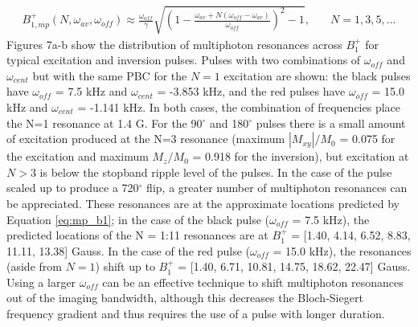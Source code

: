 \documentclass{article}
\begin{document}
\begin{equation}
\begin{array}{ll}
    B_{1,mp}^+(N,\omega_{av},\omega_{off}) \approx \frac{\omega_{off}}{\gamma} \sqrt{\left(1-\frac{\omega_{av}+ N(\omega_{off} - \omega_{av})}{\omega_{off}}\right)^2-1},  & \quad N = 1, 3, 5, \dots
    \end{array}
    \label{eq:mp_b1}
\end{equation}
Figures 7a-b show the distribution of multiphoton resonances across $B_1^+$ for typical excitation and inversion pulses. 
Pulses with two combinations of $\omega_{off}$ and $\omega_{cent}$ 
but with the same PBC for the $N=1$ excitation are shown: 
the black pulses have $\omega_{off}$ = 7.5 kHz and $\omega_{cent}$ = -3.853 kHz, 
and the red pulses have $\omega_{off}$ = 15.0 kHz and $\omega_{cent}$ = -1.141 kHz. 
In both cases, the combination of frequencies place the N=1 resonance at 1.4 G. 
For the 90$^\circ$ and 180$^\circ$ pulses there is a small amount of excitation produced at the N=3 resonance (maximum $|M_{xy}|/M_0$ = 0.075 for the excitation and maximum $M_z/M_0$ = 0.918 for the inversion), 
but excitation at $N>3$ is below the stopband ripple level of the pulses.
In the case of the pulse scaled up to produce a 720$^\circ$ flip, 
a greater number of multiphoton resonances can be appreciated. 
These resonances are at the approximate locations predicted by Equation \ref{eq:mp_b1}; 
in the case of the black pulse ($\omega_{off}$ = 7.5 kHz), 
the predicted locations of the N = 1:11 resonances are at $B_1^+$ = [1.40, 4.14, 6.52, 8.83, 11.11, 13.38] Gauss. 
In the case of the red pulse ($\omega_{off}$ = 15.0 kHz), 
the resonances (aside from $N=1$) shift up to $B_1^+$ = [1.40, 6.71, 10.81, 14.75, 18.62, 22.47] Gauss. 
Using a larger $\omega_{off}$ can be an effective technique to shift multiphoton resonances out of the imaging bandwidth, 
although this decreases the Bloch-Siegert frequency gradient and thus requires the use of a pulse with longer duration. 
 
\end{document}
